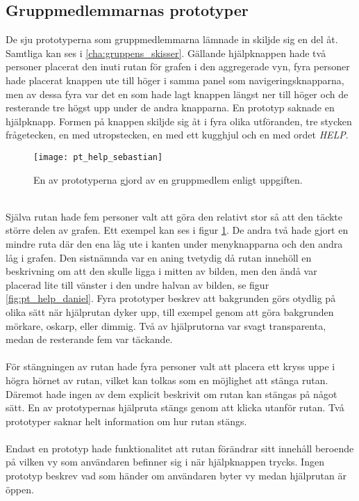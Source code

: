 \subsection{Gruppmedlemmarnas prototyper}
De sju prototyperna som gruppmedlemmarna lämnade in skiljde sig en del åt. Samtliga kan ses i \ref{cha:gruppens_skisser}. Gällande hjälpknappen hade två personer placerat den inuti rutan för grafen i den aggregerade vyn, fyra personer hade placerat knappen ute till höger i samma panel som navigeringsknapparna, men av dessa fyra var det en som hade lagt knappen längst ner till höger och de resterande tre högst upp under de andra knapparna. En prototyp saknade en hjälpknapp. Formen på knappen skiljde sig åt i fyra olika utföranden, tre stycken frågetecken, en med utropstecken, en med ett kugghjul och en med ordet \textit{HELP}. 
\\
\begin{figure}[H]
  \centering
  \texttt{[image: pt\_help\_sebastian]}
  \caption{En av prototyperna gjord av en gruppmedlem enligt uppgiften.}
  \label{fig:pt_help_prototype_example}
\end{figure}
\ \\
Själva rutan hade fem personer valt att göra den relativt stor så att den täckte större delen av grafen. Ett exempel kan ses i figur \ref{fig:pt_help_prototype_example}. De andra två hade gjort en mindre ruta där den ena låg ute i kanten under menyknapparna och den andra låg i grafen. Den sistnämnda var en aning tvetydig då rutan innehöll en beskrivning om att den skulle ligga i mitten av bilden, men den ändå var placerad lite till vänster i den undre halvan av bilden, se figur \ref{fig:pt_help_daniel}. Fyra prototyper beskrev att bakgrunden görs otydlig på olika sätt när hjälprutan dyker upp, till exempel genom att göra bakgrunden mörkare, oskarp, eller dimmig. Två av hjälprutorna var svagt transparenta, medan de resterande fem var täckande.
\\ \\
För stängningen av rutan hade fyra personer valt att placera ett kryss uppe i högra hörnet av rutan, vilket kan tolkas som en möjlighet att stänga rutan. Däremot hade ingen av dem explicit beskrivit om rutan kan stängas på något sätt. En av prototypernas hjälpruta stängs genom att klicka utanför rutan. Två prototyper saknar helt information om hur rutan stängs.
\\ \\
Endast en prototyp hade funktionalitet att rutan förändrar sitt innehåll beroende på vilken vy som användaren befinner sig i när hjälpknappen trycks. Ingen prototyp beskrev vad som händer om användaren byter vy medan hjälprutan är öppen. 

